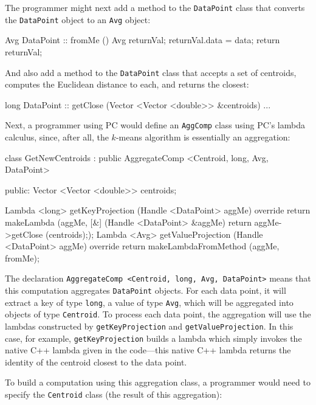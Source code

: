 \noindent
The programmer might next add a method to the \texttt{DataPoint} class that converts the \texttt{DataPoint} object to an \texttt{Avg} object:

\begin{code}
Avg DataPoint :: fromMe () {
	Avg returnVal;
	returnVal.data = data;
	return returnVal;
}
\end{code}

\noindent
And also add a method to the \texttt{DataPoint} class that accepts a set of centroids, computes the Euclidean distance to
each, and returns the closest:

\begin{code}
long DataPoint :: getClose (Vector <Vector <double>> &centroids) {...}
\end{code}

\noindent
Next, a programmer using PC would define an \texttt{AggComp} class using PC's lambda calculus, since, after all, the $k$-means algorithm is essentially 
an aggregation:

\begin{code}
class GetNewCentroids : public AggregateComp <Centroid, long, Avg, DataPoint> {

public:
   Vector <Vector <double>> centroids;

   Lambda <long> getKeyProjection (Handle <DataPoint> aggMe) override {
      return makeLambda (aggMe, [&] (Handle <DataPoint> &aggMe) 
         {return aggMe->getClose (centroids);});
   }
   Lambda <Avg> getValueProjection (Handle <DataPoint> aggMe) override {
      return makeLambdaFromMethod (aggMe, fromMe);
   }
}
\end{code}

\noindent 
The declaration \texttt{AggregateComp <Centroid, long, Avg, DataPoint>} means that this computation aggregates
\texttt{DataPoint} objects.  For each data point, it will extract a key of type \texttt{long}, a value of type \texttt{Avg}, which will be
aggregated into objects of type \texttt{Centroid}.  To process each data point, the aggregation will use the lambdas constructed by
\texttt{getKeyProjection} and \texttt{getValueProjection}.  
In this case, for example,
\texttt{getKeyProjection} builds a lambda which simply invokes the native C++ lambda given in the code---this
native C++ lambda returns the identity of the centroid closest to the data point.

To build a computation using this aggregation class, a programmer would need to specify the \texttt{Centroid} class (the result of this aggregation):


